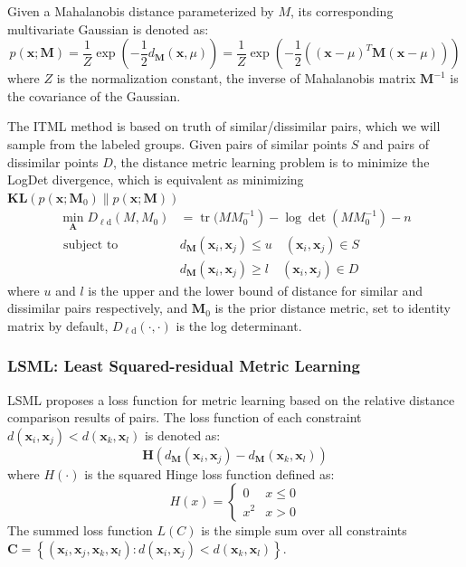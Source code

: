 Given a Mahalanobis distance parameterized by $M$, its corresponding multivariate Gaussian is denoted as:
$$
p(\mathbf{x} ; \mathbf{M})=\frac{1}{Z} \exp \left(-\frac{1}{2} d_{\mathbf{M}}(\mathbf{x}, \mu)\right)=\frac{1}{Z} \exp \left(-\frac{1}{2}\left((\mathbf{x}-\mu)^{T} \mathbf{M}(\mathbf{x}-\mu)\right)\right)
$$
where $Z$ is the normalization constant, the inverse of Mahalanobis matrix $\mathbf{M}^{-1}$ is the covariance of
the Gaussian.


The ITML method is based on truth of similar/dissimilar pairs, which we will sample from the labeled groups. Given pairs of similar points $S$ and pairs of dissimilar points $D$, the distance metric learning problem is to minimize the LogDet divergence, which is equivalent as minimizing $\mathbf{K} \mathbf{L}\left(p\left(\mathbf{x} ; \mathbf{M}_{0}\right) \| p(\mathbf{x} ; \mathbf{M})\right)$
$$
\begin{array}{rl}
\min _{\mathbf{A}} D_{\ell \mathrm{d}}\left(M, M_{0}\right)& =\operatorname{tr}(\left.M M_{0}^{-1}\right)-\log \operatorname{det}\left(M M_{0}^{-1}\right)-n \\
\text { subject to } &d_{\mathbf{M}}\left(\mathbf{x}_{i}, \mathbf{x}_{j}\right) \leq u \quad \left(\mathbf{x}_{i}, \mathbf{x}_{j}\right) \in S \\
& d_{\mathbf{M}}\left(\mathbf{x}_{i}, \mathbf{x}_{j}\right) \geq l \quad \left(\mathbf{x}_{i}, \mathbf{x}_{j}\right) \in D
\end{array}
$$
where $u$ and $l$ is the upper and the lower bound of distance for similar and dissimilar pairs respectively, and $\mathbf{M}_{0}$ is the prior distance metric, set to identity matrix by default, $D_{\ell \mathrm{d}}(\cdot, \cdot)$ is the log determinant.

 
\subsubsection{LSML: Least Squared-residual Metric Learning}

LSML\cite{LSML} proposes a loss function for metric learning based on the relative distance comparison results of pairs. The loss function of each constraint $d\left(\mathbf{x}_{i}, \mathbf{x}_{j}\right)<d\left(\mathbf{x}_{k}, \mathbf{x}_{l}\right)$ is denoted as:
$$
\boldsymbol{H}\left(d_{\mathbf{M}}\left(\mathbf{x}_{i}, \mathbf{x}_{j}\right)-d_{\mathbf{M}}\left(\mathbf{x}_{k}, \mathbf{x}_{l}\right)\right)
$$
where $H(\cdot)$ is the squared Hinge loss function defined as:
$$
H(x)=\left\{\begin{array}{ll}
0 & x \leq 0 \\
x^{2} & x>0
\end{array}\right.
$$
The summed loss function $L(C)$ is the simple sum over all constraints $\boldsymbol{C}=\left\{\left(\mathbf{x}_{i}, \mathbf{x}_{j}, \mathbf{x}_{k}, \mathbf{x}_{l}\right): d\left(\mathbf{x}_{i}, \mathbf{x}_{j}\right)<d\left(\mathbf{x}_{k}, \mathbf{x}_{l}\right)\right\} .$ 

